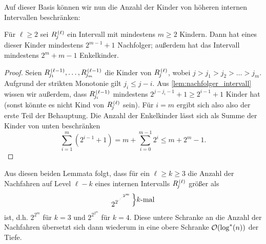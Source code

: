 Auf dieser Basis können wir nun die Anzahl der Kinder von höheren internen Intervallen beschränken:
\begin{lemma}
    Für $\ell \ge 2$ sei $\rng{\ell}{j}$ ein Intervall mit mindestens $m \ge 2$ Kindern.
    Dann hat eines dieser Kinder mindestens $2^{m-1}+1$ Nachfolger; außerdem hat das Intervall mindestens $2^m + m - 1$ Enkelkinder.
\end{lemma}
\begin{proof}
    Seien $\rng{\ell - 1}{j_1}, \ldots, \rng{\ell - 1}{j_m}$ die Kinder von $\rng{\ell}{j}$, wobei $j > j_1 > j_2 > \ldots > j_m$.
    Aufgrund der strikten Monotonie gilt $j_i \le j - i$.
    Aus \cref{lem:nachfolger_intervall} wissen wir außerdem, dass $\rng{\ell-1}{j_i}$ mindestens $2^{j - j_i - 1} + 1 \ge 2^{i-1} + 1$ Kinder hat (sonst könnte es nicht Kind von $\rng{\ell}{j}$ sein).
    Für $i = m$ ergibt sich also also der erste Teil der Behauptung.
    Die Anzahl der Enkelkinder lässt sich als Summe der Kinder von unten beschränken
    \begin{equation}
        \sum_{i=1}^m (2^{i-1} + 1) = m + \sum_{i=0}^{m-1} 2^i \le m + 2^m - 1.
    \end{equation}
\end{proof}

Aus diesen beiden Lemmata folgt, dass für ein $\ell \ge k \ge 3$ die Anzahl der Nachfahren auf Level $\ell -k$ eines internen Intervalls $\rng{\ell}{j}$ größer als
\def\rddots#1{\cdot^{\cdot^{\cdot^{#1}}}}
\begin{equation}
    2^{2^{\cdot^{\cdot^{\cdot^{2^m}}}}}
    \raisebox{\depth}{$\Bigr\}k$-mal}
\end{equation}
ist, d.h. $2^{2^m}$ für $k=3$ und $2^{2^{2^m}}$ für $k=4$.
Diese untere Schranke an die Anzahl der Nachfahren übersetzt sich dann wiederum in eine obere Schranke $\mathcal{O}\!\left(\log^*(n)\right)$ der Tiefe.